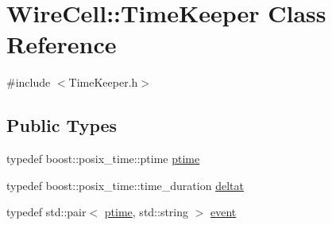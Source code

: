 \hypertarget{class_wire_cell_1_1_time_keeper}{}\section{Wire\+Cell\+:\+:Time\+Keeper Class Reference}
\label{class_wire_cell_1_1_time_keeper}


{\ttfamily \#include $<$Time\+Keeper.\+h$>$}

\subsection*{Public Types}
\begin{DoxyCompactItemize}
\item 
typedef boost\+::posix\+\_\+time\+::ptime \hyperlink{class_wire_cell_1_1_time_keeper_a3600404e97a1581a1c2630f92f490603}{ptime}
\item 
typedef boost\+::posix\+\_\+time\+::time\+\_\+duration \hyperlink{class_wire_cell_1_1_time_keeper_a3e7203525811fc9902aab31615d18ad2}{deltat}
\item 
typedef std\+::pair$<$ \hyperlink{class_wire_cell_1_1_time_keeper_a3600404e97a1581a1c2630f92f490603}{ptime}, std\+::string $>$ \hyperlink{class_wire_cell_1_1_time_keeper_a005e8d06f1e537abed3a83184ccfcc5e}{event}
\end{DoxyCompactItemize}
